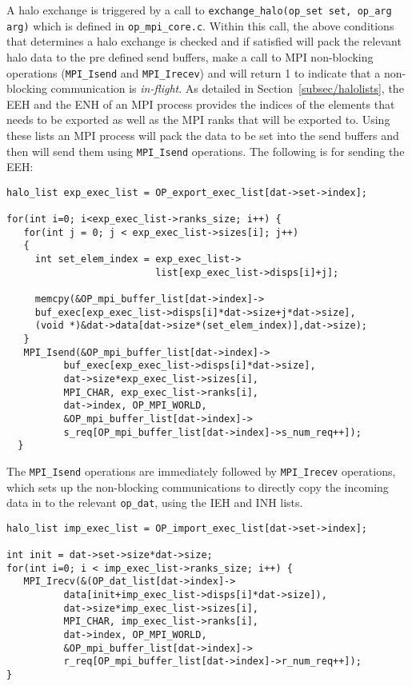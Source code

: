 \documentclass[12pt]{article}
\begin{document}
\noindent A halo exchange is triggered by a call to \texttt{exchange\_halo(op\_set set, op\_arg arg)} which is defined
in \texttt{op\_mpi\_core.c}. Within this call, the above conditions that determines a halo exchange is checked and if
satisfied will pack the relevant halo data to the pre defined send buffers, make a call to MPI non-blocking
operations (\texttt{MPI\_Isend} and \texttt{MPI\_Irecev}) and will return 1 to indicate that a non-blocking
communication is \textit{in-flight}. As detailed in Section~\ref{subsec/halolists}, the EEH and the ENH of an MPI
process provides the indices of the elements that needs to be exported as well as the MPI ranks that will be exported
to. Using these lists an MPI process will pack the data to be set into the send buffers and then will send them using
\texttt{MPI\_Isend} operations. The following is for sending the EEH:
\begin{verbatim}
halo_list exp_exec_list = OP_export_exec_list[dat->set->index];

for(int i=0; i<exp_exec_list->ranks_size; i++) {
   for(int j = 0; j < exp_exec_list->sizes[i]; j++)
   {  
     int set_elem_index = exp_exec_list->
                          list[exp_exec_list->disps[i]+j];

     memcpy(&OP_mpi_buffer_list[dat->index]->
     buf_exec[exp_exec_list->disps[i]*dat->size+j*dat->size], 
     (void *)&dat->data[dat->size*(set_elem_index)],dat->size);
   }
   MPI_Isend(&OP_mpi_buffer_list[dat->index]-> 
          buf_exec[exp_exec_list->disps[i]*dat->size],
          dat->size*exp_exec_list->sizes[i],
          MPI_CHAR, exp_exec_list->ranks[i],
          dat->index, OP_MPI_WORLD, 
          &OP_mpi_buffer_list[dat->index]->
          s_req[OP_mpi_buffer_list[dat->index]->s_num_req++]);
  } 
\end{verbatim}
\noindent The \texttt{MPI\_Isend} operations are immediately followed by \texttt{MPI\_Irecev} operations, which sets up
the non-blocking communications to directly copy the incoming data in to the relevant \texttt{op\_dat}, using the IEH
and INH lists. 
\begin{verbatim}
halo_list imp_exec_list = OP_import_exec_list[dat->set->index];

int init = dat->set->size*dat->size;
for(int i=0; i < imp_exec_list->ranks_size; i++) {
   MPI_Irecv(&(OP_dat_list[dat->index]->
          data[init+imp_exec_list->disps[i]*dat->size]),
          dat->size*imp_exec_list->sizes[i],
          MPI_CHAR, imp_exec_list->ranks[i], 
          dat->index, OP_MPI_WORLD, 
          &OP_mpi_buffer_list[dat->index]->
          r_req[OP_mpi_buffer_list[dat->index]->r_num_req++]);
}
\end{verbatim}
\end{document}

